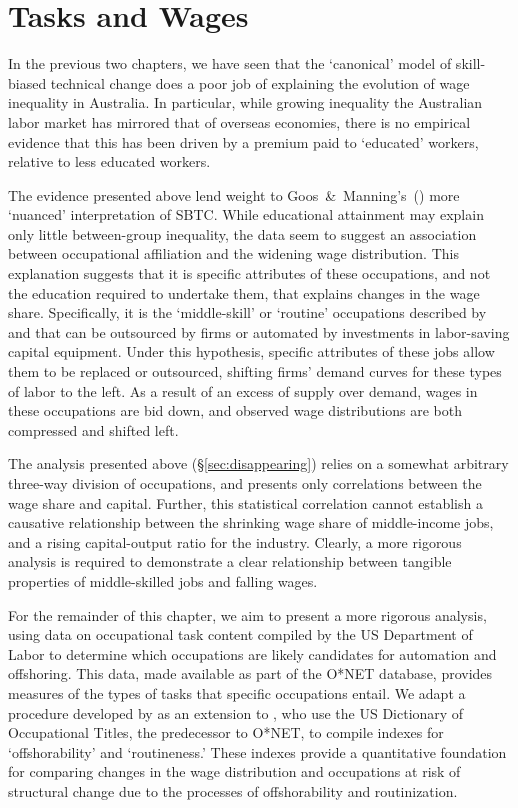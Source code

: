 
\section{Tasks and Wages}

In the previous two chapters, we have seen that the `canonical' model of skill-biased technical change does a poor job of explaining the evolution of wage inequality in Australia. In particular, while growing inequality the Australian labor market has mirrored that of overseas economies, there is no empirical evidence that this has been driven by a premium paid to `educated' workers, relative to less educated workers. 

The evidence presented above lend weight to Goos~\&~Manning's~(\citeyear{Goos2007}) more `nuanced' interpretation of SBTC. While educational attainment may explain only little between-group inequality, the data seem to suggest an association between occupational affiliation and the widening wage distribution. This explanation suggests that it is specific attributes of these occupations, and not the education required to undertake them, that explains changes in the wage share. Specifically, it is the `middle-skill' or `routine' occupations described by \citet{Levy2003} and \citet{Goos2009} that can be outsourced by firms or automated by investments in labor-saving capital equipment. Under this hypothesis, specific attributes of these jobs allow them to be replaced or outsourced, shifting firms' demand curves for these types of labor to the left. As a result of an excess of supply over demand, wages in these occupations are bid down, and observed wage distributions are both compressed and shifted left. 

The analysis presented above (\S\ref{sec:disappearing}) relies on a somewhat arbitrary three-way division of occupations, and presents only correlations between the wage share and capital. Further, this statistical correlation cannot establish a causative relationship between the shrinking wage share of middle-income jobs, and a rising capital-output ratio for the industry. Clearly, a more rigorous analysis is required to demonstrate a clear relationship between tangible properties of middle-skilled jobs and falling wages.

For the remainder of this chapter, we aim to present a more rigorous analysis, using data on occupational task content compiled by the US Department of Labor to determine which occupations are likely candidates for automation and offshoring. This data, made available as part of the O*NET database, provides measures of the types of tasks that specific occupations entail. We adapt a procedure developed by \citet{Jensen2010} as an extension to \citet{Levy2003}, who use the US Dictionary of Occupational Titles, the predecessor to O*NET, to compile indexes for `offshorability' and `routineness.' These indexes provide a quantitative foundation for comparing changes in the wage distribution and occupations at risk of structural change due to the processes of offshorability and routinization.

